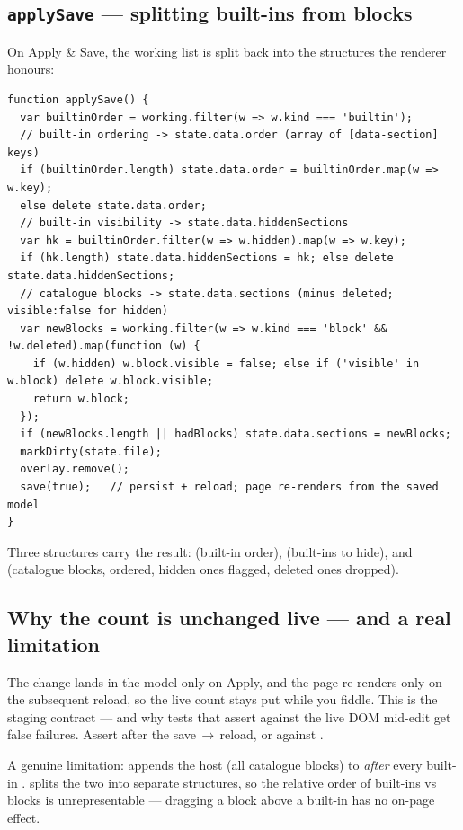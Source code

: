 \documentclass[11pt]{article}
\begin{document}
\subsection{\texttt{applySave} --- splitting built-ins from blocks}

On Apply \& Save, the working list is split back into the structures the renderer
honours:

\begin{lstlisting}
function applySave() {
  var builtinOrder = working.filter(w => w.kind === 'builtin');
  // built-in ordering -> state.data.order (array of [data-section] keys)
  if (builtinOrder.length) state.data.order = builtinOrder.map(w => w.key);
  else delete state.data.order;
  // built-in visibility -> state.data.hiddenSections
  var hk = builtinOrder.filter(w => w.hidden).map(w => w.key);
  if (hk.length) state.data.hiddenSections = hk; else delete state.data.hiddenSections;
  // catalogue blocks -> state.data.sections (minus deleted; visible:false for hidden)
  var newBlocks = working.filter(w => w.kind === 'block' && !w.deleted).map(function (w) {
    if (w.hidden) w.block.visible = false; else if ('visible' in w.block) delete w.block.visible;
    return w.block;
  });
  if (newBlocks.length || hadBlocks) state.data.sections = newBlocks;
  markDirty(state.file);
  overlay.remove();
  save(true);   // persist + reload; page re-renders from the saved model
}
\end{lstlisting}

Three structures carry the result:  (built-in order),
 (built-ins to hide), and 
(catalogue blocks, ordered, hidden ones flagged, deleted ones dropped).

\subsection{Why the count is unchanged live --- and a real limitation}

The change lands in the model only on Apply, and the page re-renders only on the
subsequent reload, so the live  count stays put while you
fiddle. This is the staging contract --- and why tests that assert against the
live DOM mid-edit get false failures. Assert after the save\,$\to$\,reload, or
against .

A genuine limitation:  appends the  host
(all catalogue blocks) to  \emph{after} every built-in
.  splits the two into separate structures, so
the relative order of built-ins vs blocks is unrepresentable --- dragging a block
above a built-in has no on-page effect.
\end{document}
